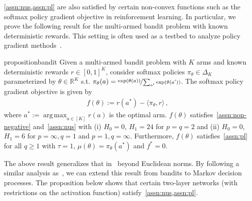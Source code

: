 \documentclass{article}
\newcommand{\R}{\mathbb{R}}
\DeclareMathOperator*{\argmax}{arg\,max}
\begin{document}
\cref{assn:nus,assn:pl} are also satisfied by certain non-convex functions such as the softmax policy gradient objective in reinforcement learning. In particular, we prove the following result for the multi-armed bandit problem with known deterministic rewards. This setting is often used as a testbed to analyze policy gradient methods~\citep{mei2020global,lu2024towards}.   

\begin{restatable}{proposition}{bandit}
Given a multi-armed bandit problem with $K$ arms and known deterministic rewards $r \in [0,1]^{K}$,  consider softmax policies $\pi_\theta \in \Delta_K$ parameterized by $\theta \in \R^K$ s.t. $\pi_\theta(a) = \nicefrac{\exp(\theta(a))}{\sum_{a'} \exp(\theta(a'))}$. The softmax policy gradient objective is given by 
\begin{align}
f(\theta) := r(a^*) - \langle \pi_\theta, r \rangle \,,
\end{align}
where $a^* := \argmax_{a \in [K]} r(a)$ is the optimal arm. $f(\theta)$ satisfies~\cref{assn:non-negative} and~\cref{assn:nus} with (i) $H_0 = 0$, $H_1 = 24$ for $p = q = 2$ and (ii) $H_0 = 0$, $H_1 = 6$ for $p = \infty, q = 1$ and $p = 1, q = \infty$. Furthermore, $f(\theta)$ satisfies~\cref{assn:pl} for all $q \geq 1$ with $\tau = 1$, $\mu(\theta) = \pi_\theta(a^*)$ and $f^* = 0$. 
\label{prop:bandits}
\end{restatable}
The above result generalizes that in~\citet{mei2021leveraging} beyond Euclidean norms. By following a similar analysis as~\citet[Proposition 7]{vaswani2025armijo}, we can extend this result from bandits to Markov decision processes. The proposition below shows that certain two-layer networks (with restrictions on the activation function) satisfy~\cref{assn:nus,assn:pl}.
\end{document}
